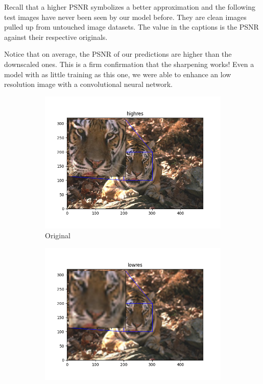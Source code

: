 \documentclass[12pt]{article}
\begin{document}
Recall that a higher PSNR symbolizes a better approximation and the following test
images have never been seen by our model before. They are clean images pulled up from
untouched image datasets. The value in the captions is the PSNR against their respective
originals.

Notice that on average, the PSNR of our predictions are higher than the downscaled ones.
This is a firm confirmation that the sharpening works! Even a model with as little
training as this one, we were able to enhance an low resolution image with a
convolutional neural network.

\singlespace
\begin{figure}[h!]
  \centering
  \begin{subfigure}[b]{0.32\linewidth}
    \includegraphics[width=\linewidth]{./0-highres.png}
    \caption{Original}
  \end{subfigure}
  \hfill
  \begin{subfigure}[b]{0.32\linewidth}
    \includegraphics[width=\linewidth]{./0-lowres.png}

\end{subfigure}
\end{figure}
\end{document}
